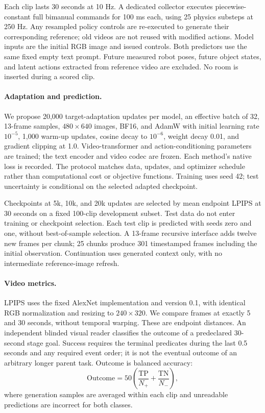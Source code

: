 Each clip lasts 30 seconds at 10 Hz. A dedicated collector executes
piecewise-constant full bimanual commands for 100 ms each, using 25 physics
substeps at 250 Hz. Any resampled policy controls are re-executed to generate
their corresponding reference; old videos are not reused with modified
actions. Model inputs are the initial RGB image and issued controls.
Both predictors use the same fixed empty text prompt.
Future measured robot poses, future object states, and latent actions
extracted from reference video are excluded. No room is inserted during a
scored clip.

\paragraph{Adaptation and prediction.}
We propose 20,000 target-adaptation updates per model, an effective batch of
32, 13-frame samples, $480\times640$ images, BF16, and AdamW with initial
learning rate $10^{-5}$, 1,000 warm-up updates, cosine decay to $10^{-6}$,
weight decay 0.01, and gradient clipping at 1.0. Video-transformer and
action-conditioning parameters are trained; the text encoder and video codec
are frozen. Each method's native loss is recorded. The protocol matches data,
updates, and optimizer schedule rather than computational cost or objective
functions. Training uses seed 42; test uncertainty is conditional on the
selected adapted checkpoint.

Checkpoints at 5k, 10k, and 20k updates are selected by mean endpoint LPIPS
at 30 seconds on a fixed 100-clip development subset. Test data do not enter
training or checkpoint selection. Each test clip is predicted with seeds
zero and one, without best-of-sample selection. A 13-frame recursive interface
adds twelve new frames per chunk; 25 chunks produce 301 timestamped frames
including the initial observation. Continuation uses generated context only,
with no intermediate reference-image refresh.

\paragraph{Video metrics.}
LPIPS uses the fixed AlexNet implementation and version 0.1, with identical
RGB normalization and resizing to $240\times320$. We compare frames at
exactly 5 and 30 seconds, without temporal warping. These are endpoint
distances. An independent blinded visual reader classifies the outcome of a
predeclared 30-second stage goal. Success requires the terminal predicates
during the last 0.5 seconds and any required event order; it is not the
eventual outcome of an arbitrary longer parent task. Outcome is balanced
accuracy:
\begin{equation}
\mathrm{Outcome}=
50\left(
\frac{\mathrm{TP}}{N_+}+
\frac{\mathrm{TN}}{N_-}
\right),
\end{equation}
where generation samples are averaged within each clip and unreadable
predictions are incorrect for both classes.

